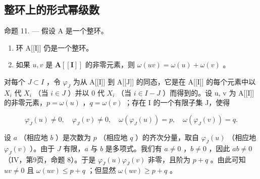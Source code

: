 \subsection{整环上的形式幂级数}

命题 11. --- 假设 A 是一个整环。

\begin{enumerate}
\def\labelenumi{(\roman{enumi})}
\item
  环 A{[}{[}I{]}{]} 仍是一个整环。
\item
  如果 \(u, v\) 是 \(\mathbf{A}[[\mathbf{I}]]\) 的非零元素，则 \(\omega(uv) = \omega(u) + \omega(v)\) 。
\end{enumerate}

对每个 \(J \subset I\) ，令 \(\varphi_{J}\) 为从 A{[}{[}I{]}{]} 到 A{[}{[}J{]}{]} 的同态，它是在 A{[}{[}I{]}{]} 的每个元素中以 \(X_{i}\) 代 \(X_{i}\) （当 \(i \in J\) ）并以 0 代 \(X_{i}\) （当 \(i \in I - J\) ）而得到的。设 u, v 为 A{[}{[}I{]}{]} 的非零元素，\(p = \omega(u)\) ，\(q = \omega(v)\) ；存在 I 的一个有限子集 J，使得

\[
\varphi_ {J} (u) \neq 0, \quad \varphi_ {J} (v) \neq 0, \quad \omega (\varphi_ {J} (u)) = p, \quad \omega (\varphi_ {J} (v)) = q.
\]

设 \(a\) （相应地 \(b\) ）是次数为 \(p\) （相应地 \(q\) ）的齐次分量，取自 \(\varphi_{J}(u)\) （相应地 \(\varphi_{J}(v)\) ）。由于 \(J\) 有限，\(a\) 与 \(b\) 是多项式。我们有 \(a \neq 0\) ，\(b \neq 0\) ，因此 \(ab \neq 0\) （IV，第9页，命题 8）。于是 \(\varphi_{J}(u) \varphi_{J}(v)\) 非零，且阶为 \(p + q\) 。由此可知 \(uv \neq 0\) 且 \(\omega(uv) \leqslant p + q\) ；但显然 \(\omega(uv) \geqslant p + q\) 。

